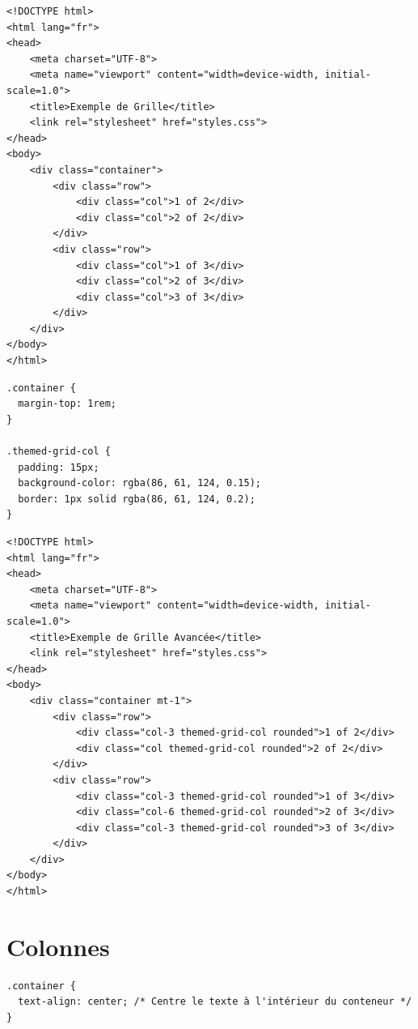 \documentclass{report}
\begin{document}
\begin{multicols*}{2}
\begin{lstlisting}[style=HTMLDraculaDark]
<!DOCTYPE html>
<html lang="fr">
<head>
    <meta charset="UTF-8">
    <meta name="viewport" content="width=device-width, initial-scale=1.0">
    <title>Exemple de Grille</title>
    <link rel="stylesheet" href="styles.css">
</head>
<body>
    <div class="container">
        <div class="row">
            <div class="col">1 of 2</div>
            <div class="col">2 of 2</div>
        </div>
        <div class="row">
            <div class="col">1 of 3</div>
            <div class="col">2 of 3</div>
            <div class="col">3 of 3</div>
        </div>
    </div>
</body>
</html>
\end{lstlisting}

\begin{lstlisting}[style=CSSDraculaLight]
.container {
  margin-top: 1rem;
}

.themed-grid-col {
  padding: 15px;
  background-color: rgba(86, 61, 124, 0.15);
  border: 1px solid rgba(86, 61, 124, 0.2);
}
\end{lstlisting}

\begin{lstlisting}[style=HTMLDraculaDark]
<!DOCTYPE html>
<html lang="fr">
<head>
    <meta charset="UTF-8">
    <meta name="viewport" content="width=device-width, initial-scale=1.0">
    <title>Exemple de Grille Avancée</title>
    <link rel="stylesheet" href="styles.css">
</head>
<body>
    <div class="container mt-1">
        <div class="row">
            <div class="col-3 themed-grid-col rounded">1 of 2</div>
            <div class="col themed-grid-col rounded">2 of 2</div>
        </div>
        <div class="row">
            <div class="col-3 themed-grid-col rounded">1 of 3</div>
            <div class="col-6 themed-grid-col rounded">2 of 3</div>
            <div class="col-3 themed-grid-col rounded">3 of 3</div>
        </div>
    </div>
</body>
</html>
\end{lstlisting}





\section*{Colonnes}

\begin{lstlisting}[style=CSSDraculaLight]
.container {
  text-align: center; /* Centre le texte à l'intérieur du conteneur */
}


\end{lstlisting}
\end{multicols*}
\end{document}
